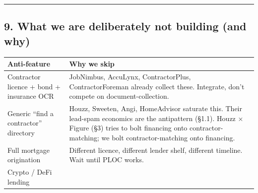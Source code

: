 \documentclass[
  10pt,
]{article}
\begin{document}
\begin{center}\rule{0.5\linewidth}{0.5pt}\end{center}

\hypertarget{what-we-are-deliberately-not-building-and-why}{%
\subsection{9. What we are deliberately not building (and
why)}\label{what-we-are-deliberately-not-building-and-why}}

\begin{longtable}[]{@{}ll@{}}
\toprule
\begin{minipage}[b]{0.47\columnwidth}\raggedright
Anti-feature\strut
\end{minipage} & \begin{minipage}[b]{0.47\columnwidth}\raggedright
Why we skip\strut
\end{minipage}\tabularnewline
\midrule
\endhead
\begin{minipage}[t]{0.47\columnwidth}\raggedright
Contractor licence + bond + insurance OCR\strut
\end{minipage} & \begin{minipage}[t]{0.47\columnwidth}\raggedright
JobNimbus, AccuLynx, ContractorPlus, ContractorForeman already collect these. Integrate, don't
compete on document-collection.\strut
\end{minipage}\tabularnewline
\begin{minipage}[t]{0.47\columnwidth}\raggedright
Generic ``find a contractor'' directory\strut
\end{minipage} & \begin{minipage}[t]{0.47\columnwidth}\raggedright
Houzz, Sweeten, Angi, HomeAdvisor saturate this. Their lead-spam economics are the antipattern
(§1.1). Houzz × Figure (§3) tries to bolt financing onto contractor-matching; we bolt
contractor-matching onto financing.\strut
\end{minipage}\tabularnewline
\begin{minipage}[t]{0.47\columnwidth}\raggedright
Full mortgage origination\strut
\end{minipage} & \begin{minipage}[t]{0.47\columnwidth}\raggedright
Different licence, different lender shelf, different timeline. Wait until PLOC works.\strut
\end{minipage}\tabularnewline
\begin{minipage}[t]{0.47\columnwidth}\raggedright
Crypto / DeFi lending\strut

\end{minipage}
\end{longtable}
\end{document}
